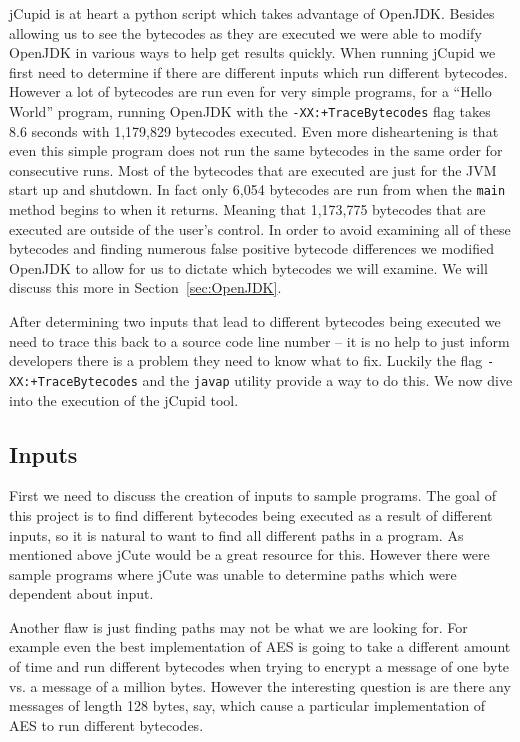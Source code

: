 jCupid is at heart a python script which takes advantage of OpenJDK. Besides allowing us to see the bytecodes as they are executed we were able to modify OpenJDK in various ways to help get results quickly. When running jCupid we first need to determine if there are different inputs which run different bytecodes. However a lot of bytecodes are run even for very simple programs, for a ``Hello World'' program, running OpenJDK with the \texttt{-XX:+TraceBytecodes} flag takes 8.6 seconds with 1,179,829 bytecodes executed. Even more disheartening is that even this simple program does not run the same bytecodes in the same order for consecutive runs. Most of the bytecodes that are executed are just for the JVM start up and shutdown. In fact only 6,054 bytecodes are run from when the \texttt{main} method begins to when it returns. Meaning that 1,173,775 bytecodes that are executed are outside of the user's control. In order to avoid examining all of these bytecodes and finding numerous false positive bytecode differences we modified OpenJDK to allow for us to dictate which bytecodes we will examine. We will discuss this more in Section~\ref{sec:OpenJDK}.

After determining two inputs that lead to different bytecodes being executed we need to trace this back to a source code line number -- it is no help to just inform developers there is a problem they need to know what to fix. Luckily the flag \texttt{-XX:+TraceBytecodes} and the \texttt{javap} utility provide a way to do this. We now dive into the execution of the jCupid tool.

\subsection{Inputs}

First we need to discuss the creation of inputs to sample programs. The goal of this project is to find different bytecodes being executed as a result of different inputs, so it is natural to want to find all different paths in a program. As mentioned above jCute would be a great resource for this. However there were sample programs where jCute was unable to determine paths which were dependent about input. 

Another flaw is just finding paths may not be what we are looking for. For example even the best implementation of AES is going to take a different amount of time and run different bytecodes when trying to encrypt a message of one byte vs. a message of a million bytes. However the interesting question is are there any messages of length 128 bytes, say, which cause a particular implementation of AES to run different bytecodes. 

